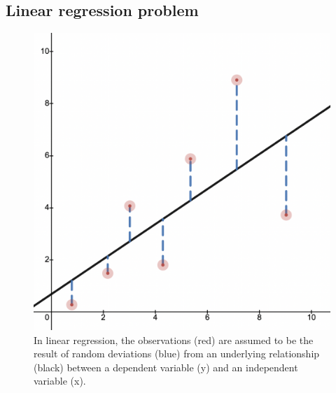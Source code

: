     \subsection*{Linear regression problem}

        \begin{figure}
            \includegraphics[width=0.33\columnwidth]{lectures/images/linear_regression.png}
            \caption*{\scriptsize{In linear regression, the observations (red) are assumed to be the result of random deviations (blue) from an underlying relationship (black) between a dependent variable (y) and an independent variable (x).}}
            \label{fig:inconsistent_with_vectors}
        \end{figure}  
        
